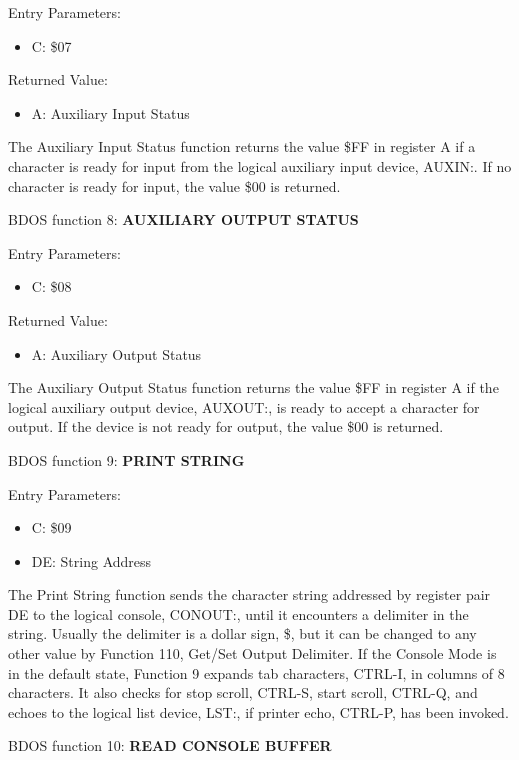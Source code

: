 Entry Parameters:
\begin{itemize}
\item[] C: \$07
\end{itemize}

Returned Value:
\begin{itemize}
\item[] A: Auxiliary Input Status
\end{itemize}

The Auxiliary Input Status function returns the value \$FF in register
A if a character is ready for input from the logical auxiliary input
device, AUXIN:. If no character is ready for input, the value \$00 is
returned.

BDOS function 8: \textbf{AUXILIARY OUTPUT STATUS}

Entry Parameters:
\begin{itemize}
\item[] C: \$08
\end{itemize}

Returned Value:
\begin{itemize}
\item[] A: Auxiliary Output Status
\end{itemize}

The Auxiliary Output Status function returns the value \$FF in
register A if the logical auxiliary output device, AUXOUT:, is ready
to accept a character for output.  If the device is not ready for
output, the value \$00 is returned.

BDOS function 9: \textbf{PRINT STRING}

Entry Parameters:
\begin{itemize}
\item[] C: \$09
\item[] DE: String Address
\end{itemize}

The Print String function sends the character string addressed by
register pair DE to the logical console, CONOUT:, until it encounters
a delimiter in the string. Usually the delimiter is a dollar sign, \$,
but it can be changed to any other value by Function 110, Get/Set
Output Delimiter. If the Console Mode is in the default state,
Function 9 expands tab characters, CTRL-I, in columns of 8
characters. It also checks for stop scroll, CTRL-S, start scroll,
CTRL-Q, and echoes to the logical list device, LST:, if printer echo,
CTRL-P, has been invoked.

BDOS function 10: \textbf{READ CONSOLE BUFFER}

